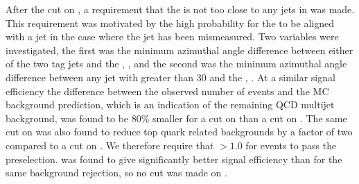 After the cut on \METsig, a requirement that the \METnoMU is not too close to any jets in \phi was made. This requirement was motivated by the high probability for the \MET to be aligned with a jet in the case where the jet has been mismeasured. Two variables were investigated, the first was the minimum azimuthal angle difference between either of the two tag jets and the \METnoMU, \jetmetdphileading, and the second was the minimum azimuthal angle difference between any jet with \pt greater than 30 \GeV and the \METnoMU, \jetmetdphi. At a similar signal efficiency the difference between the observed number of events and the \ac{MC} background prediction, which is an indication of the remaining \ac{QCD} multijet background, was found to be 80\% smaller for a cut on \jetmetdphi than a cut on \jetmetdphileading. The same cut on \jetmetdphi was also found to reduce top quark related backgrounds by a factor of two compared to a cut on \jetmetdphileading. We therefore require that \jetmetdphi$>1.0$ for events to pass the preselection. \jetmetdphi was found to give significantly better signal efficiency than \dphijj for the same background rejection, so no cut was made on \dphijj.

